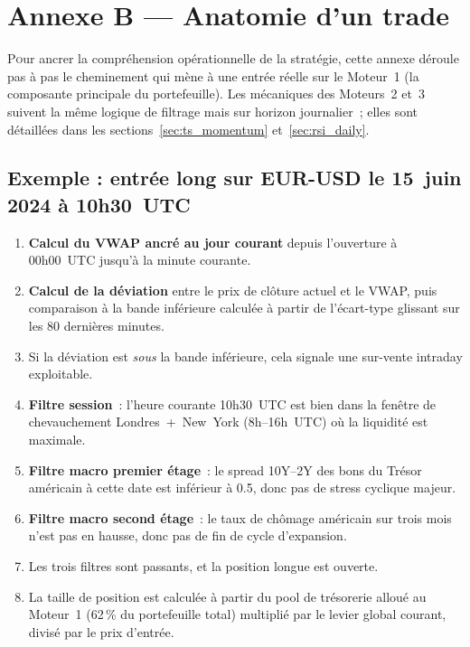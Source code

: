 \section{Annexe B --- Anatomie d'un trade}
\label{app:signal_flow}

\lettrine[lines=2, findent=2pt, nindent=0pt]{P}{o}ur ancrer la compréhension opérationnelle de la stratégie, cette annexe déroule pas à pas le cheminement qui mène à une entrée réelle sur le Moteur~1 (la composante principale du portefeuille). Les mécaniques des Moteurs~2 et~3 suivent la même logique de filtrage mais sur horizon journalier~; elles sont détaillées dans les sections~\ref{sec:ts_momentum} et~\ref{sec:rsi_daily}.

\subsection*{Exemple : entrée long sur EUR-USD le 15~juin 2024 à 10h30~UTC}

\begin{enumerate}
\item \textbf{Calcul du VWAP ancré au jour courant} depuis l'ouverture à 00h00~UTC jusqu'à la minute courante.
\item \textbf{Calcul de la déviation} entre le prix de clôture actuel et le VWAP, puis comparaison à la bande inférieure calculée à partir de l'écart-type glissant sur les 80 dernières minutes.
\item Si la déviation est \emph{sous} la bande inférieure, cela signale une sur-vente intraday exploitable.
\item \textbf{Filtre session}~: l'heure courante 10h30~UTC est bien dans la fenêtre de chevauchement Londres~+~New~York (8h--16h~UTC) où la liquidité est maximale.
\item \textbf{Filtre macro premier étage}~: le spread 10Y--2Y des bons du Trésor américain à cette date est inférieur à 0.5, donc pas de stress cyclique majeur.
\item \textbf{Filtre macro second étage}~: le taux de chômage américain sur trois mois n'est pas en hausse, donc pas de fin de cycle d'expansion.
\item Les trois filtres sont passants, et la position longue est ouverte.
\item La taille de position est calculée à partir du pool de trésorerie alloué au Moteur~1 (62\,\% du portefeuille total) multiplié par le levier global courant, divisé par le prix d'entrée.
\end{enumerate}

